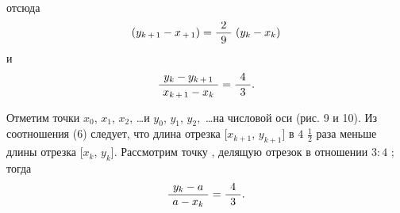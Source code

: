\begin{minipage}[t]{0.5\linewidth}
\begin{align}
\end{align}
отсюда
\begin{align}
    (y_{k\hspace{0.5mm}+\hspace{0.5mm}1} - x_{\hspace{0.5mm}+\hspace{0.5mm}1}) = \frac{\hspace{1.5mm}2\hspace{1.5mm}}{9}\hspace{1mm}(y_k - x_k)
\end{align}
\bigskip
и
\begin{equation}
    \frac{\hspace{1.5mm}y_k - y_{k\hspace{0.5mm}+\hspace{0.5mm}1}\hspace{1.5mm}}{x_{k\hspace{0.5mm}+\hspace{0.5mm}1} - x_k} = \frac{\hspace{1.5mm}4\hspace{1.5mm}}{3}.
\end{equation}

Отметим точки \hspace{1mm}$x_0$, \hspace{1mm}$x_1$, \hspace{1mm}$x_2$, \ldots и \hspace{1mm}$y_0$, \hspace{1mm}$y_1$, \hspace{1mm}$y_2,$ \ldots \hspace{1mm}на числовой оси (рис. 9 и 10). Из соотношения (6) следует, что длина отрезка $[x_{k + 1}$, \hspace{1mm}$y_{k + 1}]$ в $4$ $\frac{1}{2}$ раза меньше длины отрезка [$x_k$, \hspace{1mm}$y_k$]. Рассмотрим точку  , делящую отрезок  в отношении $3:4$ ; тогда
\begin{equation}
    \frac{\hspace{1.5mm}y_k - a\hspace{1.5mm}}{a - x_k} = \frac{\hspace{1.5mm}4\hspace{1.5mm}}{3}.
\end{equation}


\end{minipage}
